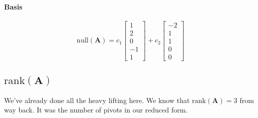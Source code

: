 \documentclass{article}
\begin{document}
            \paragraph{Basis}
                \[
                    \text{null}(\mathbf{A})=c_1\begin{bmatrix}1\\2\\0\\-1\\1\end{bmatrix}+c_2\begin{bmatrix}-2\\1\\1\\0\\0\end{bmatrix}
                \]
        \subsection[The rank of A]{$\text{rank}(\mathbf{A})$}
            We've already done all the heavy lifting here. We know that $\text{rank}(\mathbf{A})=3$ from way back.
            It was the number of pivots in our reduced form.
\end{document}

